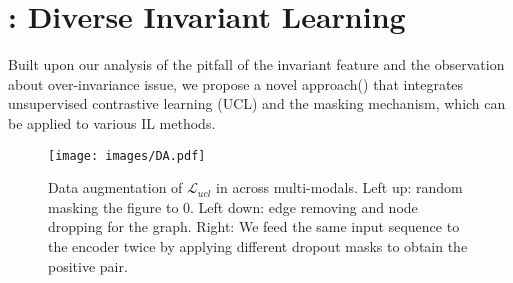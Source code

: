 







\section{\ours: Diverse Invariant Learning}
Built upon our analysis of the pitfall of the invariant feature and the observation about over-invariance issue, we propose a novel approach\oursfull (\ours) that integrates unsupervised contrastive learning (UCL) and the masking mechanism, which can be applied to various IL methods.
\begin{figure}[t]
    \centering
    \texttt{[image: images/DA.pdf]}
    \caption{Data augmentation of $\mathcal{L}_{ucl}$ in \ours across multi-modals. Left up: random masking the figure to 0. Left down: edge removing and node dropping for the graph. Right: We feed the same input sequence to the encoder twice by applying different dropout masks to obtain the positive pair.}
    \label{fig:da in ours}
\end{figure}


